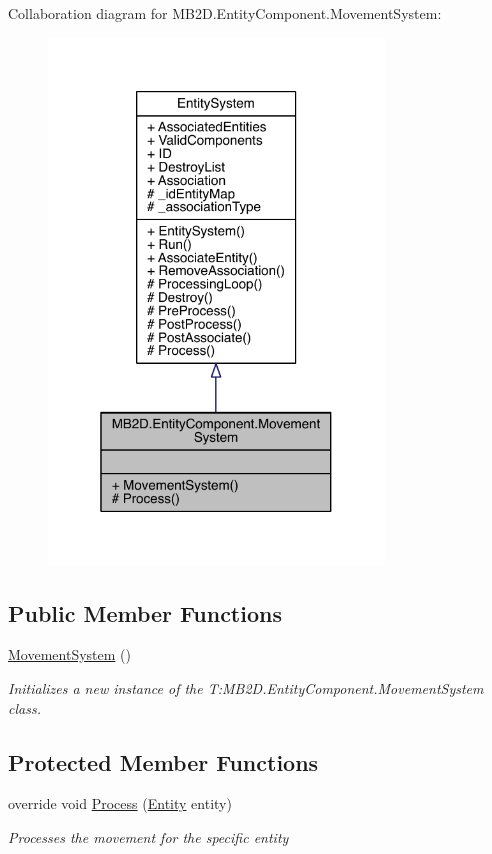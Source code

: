 Collaboration diagram for M\+B2\+D.\+Entity\+Component.\+Movement\+System\+:
\nopagebreak
\begin{figure}[H]
\begin{center}
\leavevmode
\includegraphics[width=253pt]{class_m_b2_d_1_1_entity_component_1_1_movement_system__coll__graph}
\end{center}
\end{figure}
\subsection*{Public Member Functions}
\begin{DoxyCompactItemize}
\item 
\hyperlink{class_m_b2_d_1_1_entity_component_1_1_movement_system_a64ad47c34d25ff6a9df2d2d841fc7cfb}{Movement\+System} ()
\begin{DoxyCompactList}\small\item\em Initializes a new instance of the T\+:\+M\+B2\+D.\+Entity\+Component.\+Movement\+System class. \end{DoxyCompactList}\end{DoxyCompactItemize}
\subsection*{Protected Member Functions}
\begin{DoxyCompactItemize}
\item 
override void \hyperlink{class_m_b2_d_1_1_entity_component_1_1_movement_system_afa730fd9080848ce877206c00a744cdf}{Process} (\hyperlink{class_m_b2_d_1_1_entity_component_1_1_entity}{Entity} entity)
\begin{DoxyCompactList}\small\item\em Processes the movement for the specific entity \end{DoxyCompactList}\end{DoxyCompactItemize}
